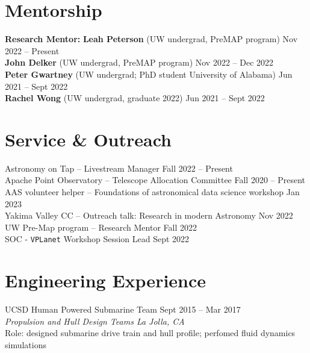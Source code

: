 \documentclass[margin,line]{resume}
\begin{document}
\begin{resume}

\section{\mysidestyle \textcolor{bcolor}{Mentorship}}
\textbf{Research Mentor:} 
\vspace{.1cm} \newline
\textbf{Leah Peterson} (UW undergrad, PreMAP program) \hfill Nov 2022 -- Present \\
\textbf{John Delker} (UW undergrad, PreMAP program) \hfill Nov 2022 -- Dec 2022 \\
\textbf{Peter Gwartney} (UW undergrad; PhD student University of Alabama) \hfill Jun 2021 -- Sept 2022 \\
\textbf{Rachel Wong} (UW undergrad, graduate 2022) \hfill Jun 2021 -- Sept 2022 


\section{\mysidestyle \textcolor{bcolor}{Service \& Outreach}}
Astronomy on Tap -- Livestream Manager \hfill Fall 2022 -- Present \\
Apache Point Observatory -- Telescope Allocation Committee \hfill Fall 2020 -- Present \\
AAS volunteer helper -- Foundations of astronomical data science workshop \hfill Jan 2023 \\
Yakima Valley CC -- Outreach talk: Research in modern Astronomy \hfill Nov 2022 \\
UW Pre-Map program -- Research Mentor \hfill Fall 2022 \\
SOC - \texttt{VPLanet} Workshop Session Lead \hfill Sept 2022 


\section{\mysidestyle \textcolor{bcolor}{Engineering Experience}}
UCSD Human Powered Submarine Team \hfill Sept 2015 -- Mar 2017 \\
\textsl{Propulsion and Hull Design Teams \hfill La Jolla, CA}  \\
Role: designed submarine drive train and hull profile; perfomed fluid dynamics simulations


\end{resume}
\end{document}
